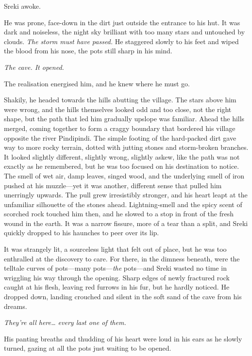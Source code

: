 \secdiv

\noindent Sreki awoke.

He was prone, face-down in the dirt just outside the entrance to his hut. It was dark and noiseless, the night sky brilliant with too many stars and untouched by clouds. \emph{The storm must have passed.} He staggered slowly to his feet and wiped the blood from his nose, the pots still sharp in his mind.

\emph{The cave. It opened.}

The realisation energised him, and he knew where he must go.

Shakily, he headed towards the hills abutting the village. The stars above him were wrong, and the hills themselves looked odd and too close, not the right shape, but the path that led him gradually upslope was familiar. Ahead the hills merged, coming together to form a craggy boundary that bordered his village opposite the river Pindipindi. The simple footing of the hard-packed dirt gave way to more rocky terrain, dotted with jutting stones and storm-broken branches. It looked slightly different, slightly wrong, slightly askew, like the path was not exactly as he remembered, but he was too focused on his destination to notice. The smell of wet air, damp leaves, singed wood, and the underlying smell of iron pushed at his muzzle---yet it was another, different sense that pulled him unerringly upwards. The pull grew irresistibly stronger, and his heart leapt at the unfamiliar silhouette of the stones ahead. Lightning-smell and the spicy scent of scorched rock touched him then, and he slowed to a stop in front of the fresh wound in the earth. It was a narrow fissure, more of a tear than a split, and Sreki quickly dropped to his haunches to peer over its lip.

It was strangely lit, a sourceless light that felt out of place, but he was too enthralled at the discovery to care. For there, in the dimness beneath, were the telltale curves of pots---many pots---\emph{the} pots---and Sreki wasted no time in wriggling his way through the opening. Sharp edges of newly fractured rock caught at his flesh, leaving red furrows in his fur, but he hardly noticed. He dropped down, landing crouched and silent in the soft sand of the cave from his dreams.

\emph{They're all here\ldots{} every last one of them.}

His panting breaths and thudding of his heart were loud in his ears as he slowly turned, gazing at all the pots just waiting to be opened.

